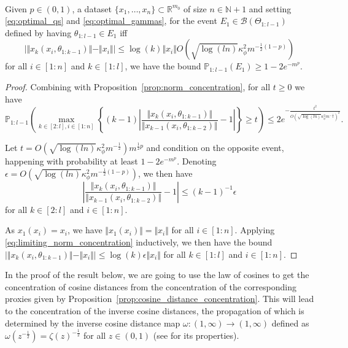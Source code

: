 \documentclass[twoside,11pt]{article}
\newcommand{\R}{\mathbb{R}}
\newcommand{\N}{\mathbb{N}}
\newcommand{\Prob}{\mathbb{P}}
\begin{document}
\begin{proposition}\label{prop:limiting_norm_concentration}~\\
Given $p \in (0,1)$, a dataset $\{x_1,\ldots,x_n\} \subset \R^{m_0}$ of size $n \in \N+1$ and setting \eqref{eq:optimal_qs} and \eqref{eq:optimal_gammas}, for the event $E_1 \in \mathcal{B}(\Theta_{1:l-1})$ defined by having $\theta_{1:l-1} \in E_1$ iff
\[
\vert \Vert x_k(x_i, \theta_{1 : k-1}) \Vert - \Vert x_i \Vert \vert \leq \log(k) \Vert x_i \Vert O\left( \sqrt{\log(ln)} \kappa_\phi^2 m^{-\frac{1}{2}(1-p)} \right)
\]
for all $i \in [1:n]$ and $k \in [1:l]$, we have the bound $\Prob_{1:l-1}(E_1) \geq 1 - 2e^{-m^p}$.
\end{proposition}
\begin{proof}
Combining \citet[Lemma~2.2.2]{Vandervaartetal2023} with Proposition~\ref{prop:norm_concentration}, for all $t \geq 0$ we have 
\[
\Prob_{1:l-1}\left( \max_{k \in [2:l], i \in [1:n]}\left\{ (k-1) \left\vert \frac{\Vert x_k(x_i, \theta_{1 : k-1}) \Vert}{\Vert x_{k-1}(x_i, \theta_{1 : k-2}) \Vert} - 1 \right\vert \right\} \geq t \right)
\leq 2e^{-\frac{t^2}{O\left( \sqrt{\log(ln)} \kappa_\phi^2 m^{-\frac{1}{2}} \right)^2}}.
\]

Let $t = O(\sqrt{\log(ln)} \kappa_\phi^2 m^{-\frac{1}{2}}) m^{\frac{1}{2}p}$ and condition on the opposite event, happening with probability at least $1 - 2e^{-m^p}$. Denoting $\epsilon = O\left( \sqrt{\log(ln)} \kappa_\phi^2 m^{-\frac{1}{2}(1-p)} \right)$, we then have
\begin{equation}\label{eq:limiting_norm_concentration}
\left\vert \frac{\Vert x_k(x_i, \theta_{1 : k-1}) \Vert}{\Vert x_{k-1}(x_i, \theta_{1 : k-2}) \Vert} - 1 \right\vert \leq (k-1)^{-1} \epsilon
\end{equation}
for all $k \in [2:l]$ and $i \in [1:n]$.

As $x_1(x_i) = x_i$, we have $\Vert x_1(x_i) \Vert = \Vert x_i \Vert$ for all $i \in [1:n]$. Applying \eqref{eq:limiting_norm_concentration} inductively, we then have the bound $\vert \Vert x_k(x_i, \theta_{1 : k-1}) \Vert - \Vert x_i \Vert \vert \leq \log(k) \epsilon \Vert x_i \Vert$ for all $k \in [1:l]$ and $i \in [1:n]$.
\end{proof}

In the proof of the result below, we are going to use the law of cosines to get the concentration of cosine distances from the concentration of the corresponding proxies given by Proposition~\ref{prop:cosine_distance_concentration}. This will lead to the concentration of the inverse cosine distances, the propagation of which is determined by the inverse cosine distance map $\omega : (1,\infty) \to (1,\infty)$ defined as $\omega(z^{-\frac{1}{2}}) = \zeta(z)^{-\frac{1}{2}}$ for all $z \in (0,1)$ (see \citet[Proposition~12]{mlpsateoc1} for its properties).
\end{document}
